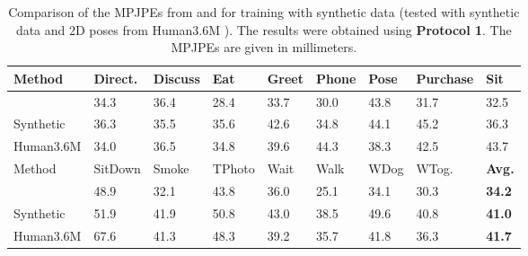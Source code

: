 \begin{table}[]	
	\centering
	\begin{tabularx}{\textwidth}{l *{8}{Y}}
		\toprule
		Method & Direct. & Discuss & Eat & Greet & Phone & Pose & Purchase & Sit \\
		\midrule
		\citet{drover18} & 34.3 & 36.4 & 28.4 & 33.7 & 30.0 & 43.8 & 31.7 & 32.5\\
		Synthetic & 36.3 & 35.5 & 35.6 & 42.6 & 34.8 & 44.1 & 45.2 & 36.3 \\
		Human3.6M & 34.0 & 36.5 & 34.8 & 39.6 & 44.3 & 38.3 & 42.5 & 43.7 \\
		\bottomrule
		\toprule
		Method & SitDown & Smoke & TPhoto & Wait & Walk & WDog & WTog. & \textbf{Avg.}\\
		\midrule
		\citet{drover18} & 48.9 & 32.1 & 43.8 & 36.0 & 25.1 & 34.1 & 30.3 & \textbf{34.2}\\
		Synthetic & 51.9 & 41.9 & 50.8 & 43.0 & 38.5 & 49.6 & 40.8 & \textbf{41.0} \\
		Human3.6M & 67.6 & 41.3 & 48.3 & 39.2 & 35.7 & 41.8 & 36.3 & \textbf{41.7} \\
		\bottomrule
	\end{tabularx}
	\caption{
		Comparison of the MPJPEs from \cite{drover18} and for training with synthetic data (tested with synthetic data and 2D poses from Human3.6M \cite{ionescu14}).
		The results were obtained using \textbf{Protocol 1}. The MPJPEs are given in millimeters.
	 }
	\label{tbl:results-original-protocol1}
\end{table}
